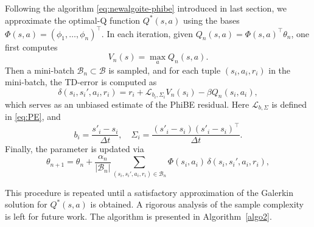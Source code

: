 \documentclass[12pt]{article}
\def\th{\theta}
\def\th{\theta}
\def\tcr{\textcolor{black}}
\def\tcr{\textcolor{red}}
\begin{document}
Following the algorithm \eqref{eq:newalgoite-phibe} introduced in last section, we approximate the optimal-Q function $Q^*(s,a)$ using the bases $\Phi(s,a)=(\phi_1,\dots,\phi_n)^\top$.  In each iteration, given $Q_n(s,a) = \Phi(s,a)^\top\th_n$, one first computes 
\[
V_n(s) = \max_a Q_n(s,a).
\]
Then a mini-batch $\mathcal{B}_n\subset\mathcal{B}$ is sampled, and for each tuple $(s_i,a_i,r_i)$ in the mini-batch, the TD-error is computed as
\begin{equation}\label{td-data}
 \delta(s_i,s_i',a_i,r_i) = r_i + \mathcal{L}_{b_i, \Sigma_i}V_n(s_i)  - \beta Q_n(s_i,a_i),   
\end{equation}
which serves as an unbiased estimate of the PhiBE residual. Here $\mathcal{L}_{b,\Sigma}$ is defined in \eqref{eq:PE}, and 
\[
b_i = \frac{s'_i - s_i}{\Delta t}, \quad 
\hat \Sigma_i = \frac{(s'_i - s_i)(s'_i - s_i)^\top}{\Delta t}.
\]
Finally, the parameter is updated via
\begin{equation}\label{phibe-q-rule}
\theta_{n+1} = \theta_n +  \frac{\alpha_n}{|\mathcal{B}_n|} \sum_{(s_i,s_i',a_i,r_i)\in\mathcal{B}_n} \Phi(s_i,a_i)\, \delta(s_i,s_i',a_i,r_i),
\end{equation}

This procedure is repeated until a satisfactory approximation of the Galerkin solution for $Q^*(s,a)$ is obtained. 
A rigorous analysis of the sample complexity is left for future work.
The algorithm is presented in Algorithm~\ref{algo2}.
\end{document}
